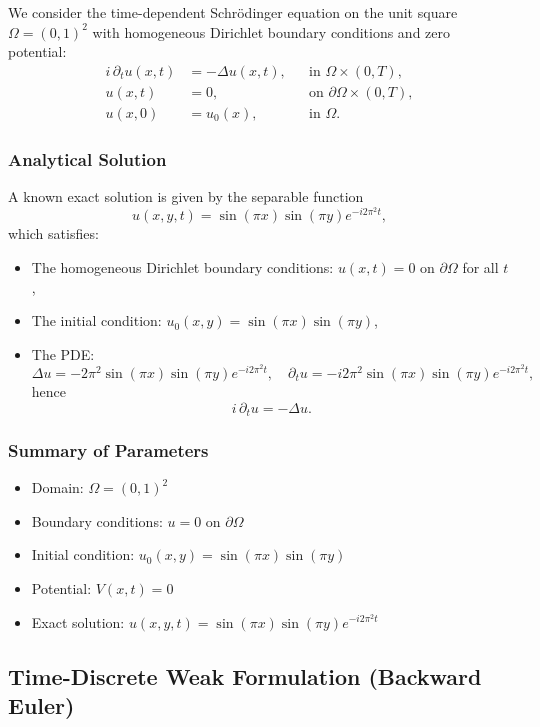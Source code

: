 \documentclass{article}
\theoremstyle{definition}
\theoremstyle{plain}
\theoremstyle{remark}
\begin{document}
We consider the time-dependent Schrödinger equation on the unit square $\Omega = (0,1)^2$ with homogeneous Dirichlet boundary conditions and zero potential:
\begin{align*}
i \, \partial_t u(x,t) &= -\Delta u(x,t), &&\text{in } \Omega \times (0,T), \\
u(x,t) &= 0, &&\text{on } \partial \Omega \times (0,T), \\
u(x,0) &= u_0(x), &&\text{in } \Omega.
\end{align*}

\subsubsection*{Analytical Solution}

A known exact solution is given by the separable function
\[
u(x,y,t) = \sin(\pi x)\sin(\pi y) e^{-i 2\pi^2 t},
\]
which satisfies:
\begin{itemize}
  \item The homogeneous Dirichlet boundary conditions: $u(x,t) = 0$ on $\partial \Omega$ for all $t$,
  \item The initial condition: $u_0(x,y) = \sin(\pi x)\sin(\pi y)$,
  \item The PDE:
  \[
  \Delta u = -2\pi^2 \sin(\pi x)\sin(\pi y) e^{-i 2\pi^2 t}, \quad
  \partial_t u = -i 2\pi^2 \sin(\pi x)\sin(\pi y) e^{-i 2\pi^2 t},
  \]
  hence
  \[
  i \, \partial_t u = -\Delta u.
  \]
\end{itemize}

\subsubsection*{Summary of Parameters}
\begin{itemize}
  \item Domain: $\Omega = (0,1)^2$
  \item Boundary conditions: $u = 0$ on $\partial \Omega$
  \item Initial condition: $u_0(x,y) = \sin(\pi x)\sin(\pi y)$
  \item Potential: $V(x,t) = 0$
  \item Exact solution: $u(x,y,t) = \sin(\pi x)\sin(\pi y) e^{-i 2\pi^2 t}$
\end{itemize}


\subsection*{Time-Discrete Weak Formulation (Backward Euler)}
\end{document}
